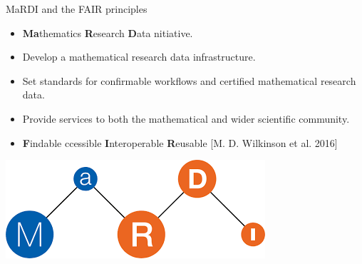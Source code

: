 \documentclass[9pt]{beamer}
\theoremstyle{definition}
\begin{document}
\begin{frame}[fragile]{MaRDI and the FAIR principles}
  \begin{itemize}
  \item \textbf{Ma}thematics \textbf{R}esearch \textbf{D}ata nitiative.
  \item Develop a mathematical research data infrastructure.
  \item Set standards for confirmable workflows and certified mathematical research data.
  \item Provide services to both the mathematical and wider scientific community.
  \item \textbf{F}indable ccessible \textbf{I}nteroperable \textbf{R}eusable [M. D. Wilkinson et al. 2016]

  \end{itemize}
  \begin{center}
    \includegraphics[height=0.2\textheight]{images/mardi-logo}
  \end{center}
\end{frame}

\end{document}
